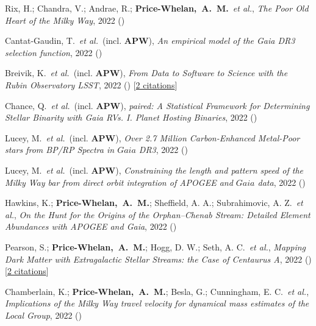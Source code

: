 \item[{\color{deemph}\scriptsize19}]Rix, H.; Chandra, V.; Andrae, R.; \textbf{Price-Whelan,~A.~M.}~\textit{et al.}, \textit{The Poor Old Heart of the Milky Way}, 2022 ()

\item[{\color{deemph}\scriptsize18}]Cantat-Gaudin, T.~\textit{et al.}~(incl. \textbf{APW}), \textit{An empirical model of the Gaia DR3 selection function}, 2022 ()

\item[{\color{deemph}\scriptsize17}]Breivik, K.~\textit{et al.}~(incl. \textbf{APW}), \textit{From Data to Software to Science with the Rubin Observatory LSST}, 2022 () [\href{http://adsabs.harvard.edu/abs/2022arXiv220802781B}{2 citations}]

\item[{\color{deemph}\scriptsize16}]Chance, Q.~\textit{et al.}~(incl. \textbf{APW}), \textit{paired: A Statistical Framework for Determining Stellar Binarity with Gaia RVs. I. Planet Hosting Binaries}, 2022 ()

\item[{\color{deemph}\scriptsize15}]Lucey, M.~\textit{et al.}~(incl. \textbf{APW}), \textit{Over 2.7 Million Carbon-Enhanced Metal-Poor stars from BP/RP Spectra in $Gaia$ DR3}, 2022 ()

\item[{\color{deemph}\scriptsize14}]Lucey, M.~\textit{et al.}~(incl. \textbf{APW}), \textit{Constraining the length and pattern speed of the Milky Way bar from direct orbit integration of APOGEE and $Gaia$ data}, 2022 ()

\item[{\color{deemph}\scriptsize13}]Hawkins, K.; \textbf{Price-Whelan,~A.~M.}; Sheffield, A. A.; Subrahimovic, A. Z.~\textit{et al.}, \textit{On the Hunt for the Origins of the Orphan--Chenab Stream: Detailed Element Abundances with APOGEE and Gaia}, 2022 ()

\item[{\color{deemph}\scriptsize12}]Pearson, S.; \textbf{Price-Whelan,~A.~M.}; Hogg, D. W.; Seth, A. C.~\textit{et al.}, \textit{Mapping Dark Matter with Extragalactic Stellar Streams: the Case of Centaurus A}, 2022 () [\href{http://adsabs.harvard.edu/abs/2022arXiv220512277P}{2 citations}]

\item[{\color{deemph}\scriptsize11}]Chamberlain, K.; \textbf{Price-Whelan,~A.~M.}; Besla, G.; Cunningham, E. C.~\textit{et al.}, \textit{Implications of the Milky Way travel velocity for dynamical mass estimates of the Local Group}, 2022 ()

